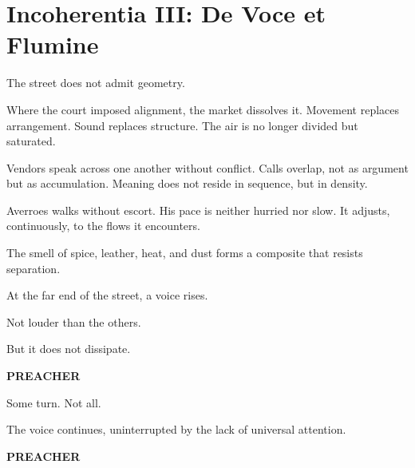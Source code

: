 
\chapter*{Incoherentia III: De Voce et Flumine}


The street does not admit geometry.

Where the court imposed alignment, the market dissolves it. Movement replaces
arrangement. Sound replaces structure. The air is no longer divided but
saturated.

Vendors speak across one another without conflict. Calls overlap, not as
argument but as accumulation. Meaning does not reside in sequence, but in
density.

Averroes walks without escort. His pace is neither hurried nor slow. It
adjusts, continuously, to the flows it encounters.

The smell of spice, leather, heat, and dust forms a composite that resists
separation.

At the far end of the street, a voice rises.

Not louder than the others.

But it does not dissipate.

\medskip

\textbf{PREACHER}


\medskip

Some turn. Not all.

The voice continues, uninterrupted by the lack of universal attention.

\medskip

\textbf{PREACHER}


